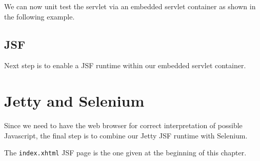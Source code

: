 We can now unit test the servlet via an embedded servlet container as shown in the following example.


\subsection{JSF}

Next step is to enable a JSF runtime within our embedded servlet container.


\section{Jetty and Selenium}
Since we need to have the web browser for correct interpretation of possible Javascript, the final step is to combine our Jetty JSF runtime with Selenium.

The \texttt{index.xhtml} JSF page is the one given at the beginning of this chapter.